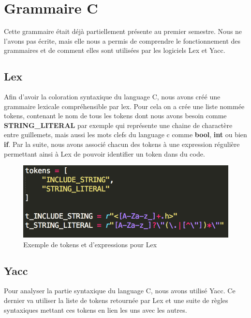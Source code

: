 \documentclass[a4paper,12pt]{article}
\begin{document}
\section{Grammaire C}

	Cette grammaire était déjà partiellement présente au premier semestre. Nous ne l'avons pas écrite, mais elle nous a permis de comprendre le fonctionnement des grammaires et de comment elles sont utilisées par les logiciels Lex et Yacc.

	\subsection{Lex}

		Afin d'avoir la coloration syntaxique du language C, nous avons créé une grammaire lexicale compréhensible par lex. Pour cela on a crée une liste nommée tokens, contenant le nom de tous les tokens dont nous avons besoin comme \textbf{STRING\_LITERAL} par exemple qui représente une chaine de charactère entre guillemets, mais aussi les mots clefs du language c comme \textbf{bool}, \textbf{int} ou bien \textbf{if}. Par la suite, nous avons associé chacun des tokens à une expression régulière permettant ainsi à Lex de pouvoir identifier un token dans du code.
		
		\begin{figure}[h!]
				\begin{center}
					\includegraphics[scale=0.45]{images/lexC}
					\caption{Exemple de tokens et d'expressions pour Lex}
				\end{center}
		\end{figure}

	\subsection{Yacc}

		Pour analyser la partie syntaxique du language C, nous avons utilisé Yacc. Ce dernier va utiliser la liste de tokens retournée par Lex et une suite de règles syntaxiques mettant ces tokens en lien les uns avec les autres.
\end{document}

